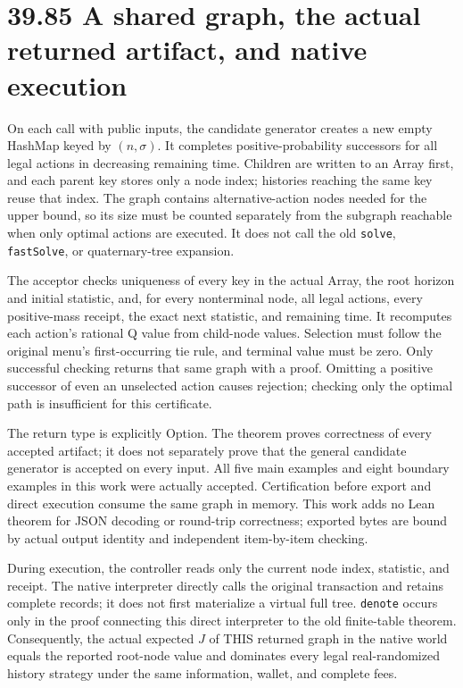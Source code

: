\documentclass[
  english,
  11pt,
  oneside]{book}
\begin{document}
\section{39.85 A shared graph, the actual returned artifact, and native execution}\label{a-shared-graph-the-actual-returned-artifact-and-native-execution}

On each call with public inputs, the candidate generator creates a new empty HashMap keyed by \((n,\sigma)\). It completes positive-probability successors for all legal actions in decreasing remaining time. Children are written to an Array first, and each parent key stores only a node index; histories reaching the same key reuse that index. The graph contains alternative-action nodes needed for the upper bound, so its size must be counted separately from the subgraph reachable when only optimal actions are executed. It does not call the old \texttt{solve}, \texttt{fastSolve}, or quaternary-tree expansion.

The acceptor checks uniqueness of every key in the actual Array, the root horizon and initial statistic, and, for every nonterminal node, all legal actions, every positive-mass receipt, the exact next statistic, and remaining time. It recomputes each action's rational Q value from child-node values. Selection must follow the original menu's first-occurring tie rule, and terminal value must be zero. Only successful checking returns that same graph with a proof. Omitting a positive successor of even an unselected action causes rejection; checking only the optimal path is insufficient for this certificate.

The return type is explicitly Option. The theorem proves correctness of every accepted artifact; it does not separately prove that the general candidate generator is accepted on every input. All five main examples and eight boundary examples in this work were actually accepted. Certification before export and direct execution consume the same graph in memory. This work adds no Lean theorem for JSON decoding or round-trip correctness; exported bytes are bound by actual output identity and independent item-by-item checking.

During execution, the controller reads only the current node index, statistic, and receipt. The native interpreter directly calls the original transaction and retains complete records; it does not first materialize a virtual full tree. \texttt{denote} occurs only in the proof connecting this direct interpreter to the old finite-table theorem. Consequently, the actual expected \(J\) of THIS returned graph in the native world equals the reported root-node value and dominates every legal real-randomized history strategy under the same information, wallet, and complete fees.
\end{document}
